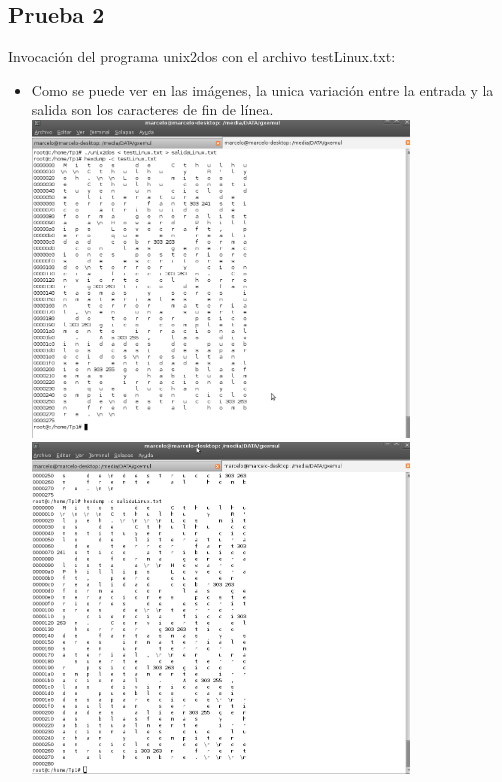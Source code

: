 \documentclass[a4paper,10pt]{article}
\begin{document}
    \subsection{Prueba 2}
    Invocaci\'on del programa unix2dos con el archivo testLinux.txt:
    \begin{itemize}
     \item Como se puede ver en las im\'agenes, la unica variaci\'on entre la entrada y la salida son los caracteres de fin de l\'inea.	
     \newline
      \includegraphics[width=10cm, viewport=0 0 1008 847]{Imagenes/testLinux.png}
     \newline
      \includegraphics[width=10cm, viewport=0 0 1005 882]{Imagenes/salidaLinux.png}
    \end{itemize}
\end{document}
